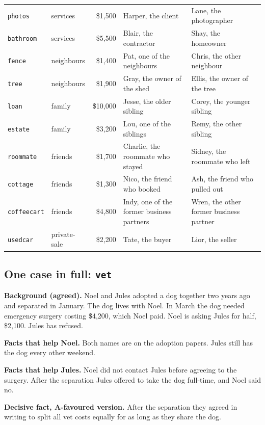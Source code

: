 \begin{center}
\begin{tabular}{@{}l l r l l@{}}
\texttt{photos} & services & \$1,500 & Harper, the client & Lane, the photographer \\
\texttt{bathroom} & services & \$5,500 & Blair, the contractor & Shay, the homeowner \\
\texttt{fence} & neighbours & \$1,400 & Pat, one of the neighbours & Chris, the other neighbour \\
\texttt{tree} & neighbours & \$1,900 & Gray, the owner of the shed & Ellis, the owner of the tree \\
\texttt{loan} & family & \$10,000 & Jesse, the older sibling & Corey, the younger sibling \\
\texttt{estate} & family & \$3,200 & Lou, one of the siblings & Remy, the other sibling \\
\texttt{roommate} & friends & \$1,700 & Charlie, the roommate who stayed & Sidney, the roommate who left \\
\texttt{cottage} & friends & \$1,300 & Nico, the friend who booked & Ash, the friend who pulled out \\
\texttt{coffeecart} & friends & \$4,800 & Indy, one of the former business partners & Wren, the other former business partner \\
\texttt{usedcar} & private-sale & \$2,200 & Tate, the buyer & Lior, the seller \\
\bottomrule
\end{tabular}
\end{center}

\subsection{One case in full: \texttt{vet}}
\textbf{Background (agreed).} Noel and Jules adopted a dog together two years ago and separated in January. The dog lives with Noel. In March the dog needed emergency surgery costing \$4,200, which Noel paid. Noel is asking Jules for half, \$2,100. Jules has refused.

\textbf{Facts that help Noel.} Both names are on the adoption papers. Jules still has the dog every other weekend.

\textbf{Facts that help Jules.} Noel did not contact Jules before agreeing to the surgery. After the separation Jules offered to take the dog full-time, and Noel said no.

\textbf{Decisive fact, A-favoured version.} After the separation they agreed in writing to split all vet costs equally for as long as they share the dog.

